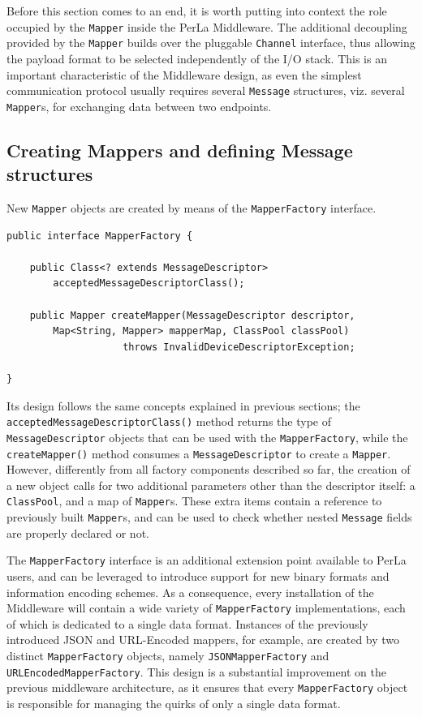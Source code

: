 Before this section comes to an end, it is worth putting into context the role
occupied by the \texttt{Mapper} inside the PerLa Middleware. The additional
decoupling provided by the \texttt{Mapper} builds over the pluggable
\texttt{Channel} interface, thus allowing the payload format to be selected
independently of the I/O stack.  This is an important characteristic of the
Middleware design, as even the simplest communication protocol usually requires
several \texttt{Message} structures, viz. several \texttt{Mapper}s, for
exchanging data between two endpoints.


\subsection{Creating Mappers and defining Message structures}

New \texttt{Mapper} objects are created by means of the \texttt{MapperFactory}
interface.

\lstset{language=Java}
\begin{lstlisting}[float,floatplacement=!hbt,caption=The Mapper Factory
interface,label={lst:mapperFactory}]
public interface MapperFactory {

    public Class<? extends MessageDescriptor>
        acceptedMessageDescriptorClass();

    public Mapper createMapper(MessageDescriptor descriptor,
        Map<String, Mapper> mapperMap, ClassPool classPool)
                    throws InvalidDeviceDescriptorException;

}
\end{lstlisting}

Its design follows the same concepts explained in previous sections; the
\texttt{acceptedMessageDescriptorClass()} method returns the type of
\texttt{MessageDescriptor} objects that can be used with the
\texttt{MapperFactory}, while the \texttt{createMapper()} method consumes a
\texttt{MessageDescriptor} to create a \texttt{Mapper}. However, differently
from all factory components described so far, the creation of a new object
calls for two additional parameters other than the descriptor itself: a
\texttt{ClassPool}, and a map of \texttt{Mapper}s. These extra items contain a
reference to previously built \texttt{Mapper}s, and can be used to check
whether nested \texttt{Message} fields are properly declared or not.

The \texttt{MapperFactory} interface is an additional extension point available
to PerLa users, and can be leveraged to introduce support for new binary
formats and information encoding schemes. As a consequence, every installation
of the Middleware will contain a wide variety of \texttt{MapperFactory}
implementations, each of which is dedicated to a single data format. Instances
of the previously introduced JSON and URL-Encoded mappers, for example, are
created by two distinct \texttt{MapperFactory} objects, namely
\texttt{JSONMapperFactory} and \texttt{URLEncodedMapperFactory}. This design is
a substantial improvement on the previous middleware architecture, as it
ensures that every \texttt{MapperFactory} object is responsible for managing
the quirks of only a single data format.

